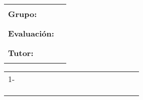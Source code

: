 

\begin{tabular}{>{\raggedleft\arraybackslash}p{2.2cm}l}
\textbf{Grupo:} & \rule{3cm}{.5pt}  \\
\textbf{Evaluación:} & \rule{3cm}{.5pt} \\
\textbf{Tutor:} & \rule{3cm}{.5pt} \\
\end{tabular}

\begin{table}[th]
\centering
\begin{tabular}{r p{6cm}|p{0.4cm}|p{0.4cm}|p{0.4cm}|p{0.4cm}|p{0.4cm}|p{0.4cm}|p{0.4cm}|p{0.4cm}|p{0.4cm}|p{0.4cm}|p{0.4cm}|p{0.4cm}|p{0.4cm}|p{0.4cm}|}
&  &  &  &  &  &  &  &  &  &  &  &  &  &  &\\ [4cm]
\hline
\hline
\rowcolor{Gray}
 1- &  &  &  &  &  &  &  &  &  &  &  &  &  &  &\\
  &  &  &  &  &  &  &  &  &  &  &  &  &  &  &\\
 \rowcolor{Gray}
  &  &  &  &  &  &  &  &  &  &  &  &  &  &  &\\
  &  &  &  &  &  &  &  &  &  &  &  &  &  &  &\\
\hline
\end{tabular}
\end{table}

\newpage
